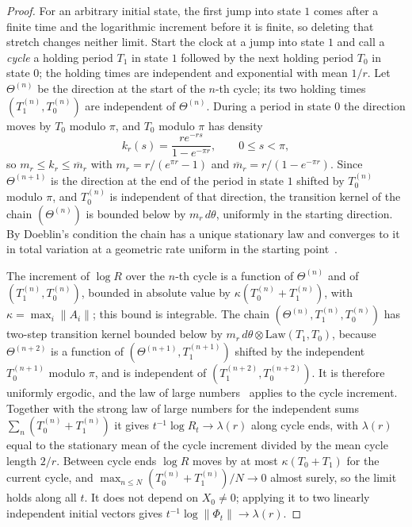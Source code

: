 \documentclass[11pt]{amsart}
\begin{document}
\begin{proof}
For an arbitrary initial state, the first jump into state $1$ comes after a finite time and the logarithmic
increment before it is finite, so deleting that stretch changes neither limit. Start the clock at a jump into state
$1$ and call a \emph{cycle} a holding period $T_1$ in state $1$ followed by the
next holding period $T_0$ in state $0$; the holding times are independent and exponential with mean $1/r$. Let
$\Theta^{(n)}$ be the direction at the start of the $n$-th cycle; its two holding times $(T_1^{(n)},T_0^{(n)})$ are
independent of $\Theta^{(n)}$. During a period in state $0$ the direction moves by
$T_0$ modulo $\pi$, and $T_0$ modulo $\pi$ has density
\begin{equation}\label{eq:kr}
k_r(s)=\frac{re^{-rs}}{1-e^{-\pi r}},\qquad 0\le s<\pi,
\end{equation}
so $m_r\le k_r\le\overline m_r$ with $m_r=r/(e^{\pi r}-1)$ and $\overline m_r=r/(1-e^{-\pi r})$. Since $\Theta^{(n+1)}$ is the
direction at the end of the period in state $1$ shifted by $T_0^{(n)}$ modulo $\pi$, and $T_0^{(n)}$ is independent of
that direction, the transition kernel of the chain $(\Theta^{(n)})$ is bounded below by
$m_r\,d\theta$, uniformly in the starting direction. By Doeblin's condition the chain has a unique stationary law
and converges to it in total variation at a geometric rate uniform in the starting
point~\cite[Theorem~16.0.2]{MT09}.

The increment of $\log R$ over the $n$-th cycle is a function of $\Theta^{(n)}$ and of $(T_1^{(n)},T_0^{(n)})$, bounded
in absolute value by $\kappa(T_0^{(n)}+T_1^{(n)})$, with $\kappa=\max_i\|A_i\|$; this bound is integrable. The
chain $(\Theta^{(n)},T_1^{(n)},T_0^{(n)})$ has two-step transition kernel bounded below by
$m_r\,d\theta\otimes\mathrm{Law}(T_1,T_0)$, because $\Theta^{(n+2)}$ is a function of $(\Theta^{(n+1)},T_1^{(n+1)})$
shifted by the independent $T_0^{(n+1)}$ modulo $\pi$, and is independent of $(T_1^{(n+2)},T_0^{(n+2)})$. It is
therefore uniformly ergodic, and the law of large numbers~\cite[Theorem~17.0.1]{MT09} applies to the cycle increment.
Together with the strong law of large numbers for the independent sums $\sum_n(T_0^{(n)}+T_1^{(n)})$ it gives
$t^{-1}\log R_t\to\lambda(r)$ along cycle ends, with $\lambda(r)$ equal to the stationary mean of the cycle increment
divided by the mean cycle length $2/r$. Between cycle ends $\log R$ moves by at most $\kappa(T_0+T_1)$ for the
current cycle, and $\max_{n\le N}(T_0^{(n)}+T_1^{(n)})/N\to0$ almost surely, so the limit holds along all $t$. It does not depend
on $X_0\ne0$; applying it to two linearly independent initial vectors gives $t^{-1}\log\|\Phi_t\|\to\lambda(r)$.


\end{proof}
\end{document}
